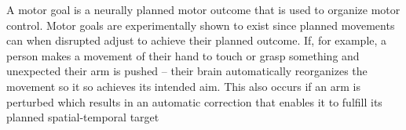 \documentclass[a4paper]{article}
\title{}
\date{}
\author{Mohammad Rahmani}
\begin{document}
    \maketitle
    A motor goal is a neurally planned motor outcome that is used to organize motor control.
    Motor goals are experimentally shown to exist since planned movements can when disrupted adjust to achieve their planned outcome. If, for example, a person makes a movement of their hand to touch or grasp something and unexpected their arm is pushed – their brain automatically reorganizes the movement so it so achieves its intended aim. This also occurs if an arm is perturbed which results in an automatic correction that enables it to fulfill its planned spatial-temporal target 
    
    
\end{document}
